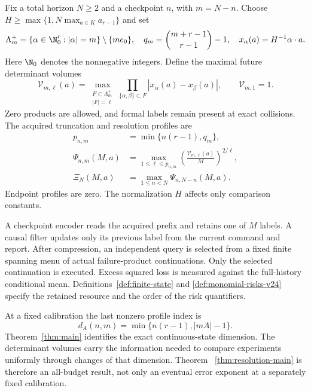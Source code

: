 Fix a total horizon $N\ge2$ and a checkpoint $n$, with $m=N-n$.
Choose $H\ge\max\{1,N\max_{a\in K}a_{r-1}\}$ and set
\[
 \Lambda_m^+=\{\alpha\in\N_0^r:|\alpha|=m\}\setminus\{me_0\},
 \quad q_m=\binom{m+r-1}{r-1}-1,
 \quad x_\alpha(a)=H^{-1}\alpha\cdot a.
\]
Here $\N_0$ denotes the nonnegative integers. Define the maximal
future determinant volumes
\[
 \mathcal V_{m,\ell}(a)=
 \max_{\substack{F\subset\Lambda_m^+\\|F|=\ell}}
       \prod_{\{\alpha,\beta\}\subset F}
                      |x_\alpha(a)-x_\beta(a)|,
                      \qquad \mathcal V_{m,1}=1.
\]
Zero products are allowed, and formal labels remain present at exact
collisions. The acquired truncation and resolution profiles are
\[
 \begin{split}
 p_{n,m}&=\min\{n(r-1),q_m\},\\
 \Psi_{n,m}(M,a)&=
   \max_{1\le\ell\le p_{n,m}}
       \left(\frac{\mathcal V_{m,\ell}(a)}{M}\right)^{2/\ell},\\
 \Xi_N(M,a)&=\max_{1\le n<N}\Psi_{n,N-n}(M,a).
 \end{split}
\]
Endpoint profiles are zero. The normalization $H$ affects only
comparison constants.

A checkpoint encoder reads the acquired prefix and retains one of $M$
labels. A causal filter updates only its previous label from the current
command and report. After compression, an independent query is selected
from a fixed finite spanning menu of actual failure-product
continuations. Only the selected continuation is executed. Excess
squared loss is measured against the full-history conditional mean.
Definitions~\ref{def:finite-state} and
\ref{def:monomial-risks-v24} specify the retained resource and the
order of the risk quantifiers.



At a fixed calibration the last nonzero profile index is
\[
             d_A(n,m)=\min\{n(r-1),|mA|-1\}.
\]
Theorem~\ref{thm:main} identifies the exact continuous-state dimension.
The determinant volumes carry the information needed to compare
experiments uniformly through changes of that dimension. Theorem~
\ref{thm:resolution-main} is therefore an all-budget result, not only
an eventual error exponent at a separately fixed calibration.

